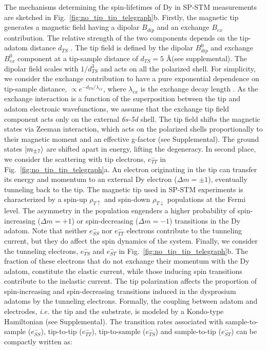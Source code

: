 \documentclass[
reprint,amsmath,amssymb,aps]{revtex4-2}
\begin{document}
The mechanisms determining the spin-lifetimes of Dy in SP-STM measurements are sketched in Fig.~\ref{fig:no_tip_tip_telegraph}b.
Firstly, the magnetic tip generates a magnetic field having a dipolar $B_{dip}$ and an exchange $B_{ex}$ contribution. The relative strength of the two components depends on the tip-adatom distance $d_{TS}$ \cite{willke}. 
The tip field is defined by the dipolar $B^0_{dip}$ and exchange $B^0_{ex}$ component at a tip-sample distance of $d_{TS}=5$ \AA (see supplemental). The dipolar field scales with $1/d_{TS}^3$ and acts on all the polarized shell. For simplicity, we consider the exchange contribution to have a pure exponential dependence on tip-sample distance, $\propto e^{-d_{TS}/\lambda_{ex}}$, where $\lambda_{ex}$ is the exchange decay length \cite{}.
As the exchange interaction is a function of the superposition between the tip and adatom electronic wavefunctions, we assume that the exchange tip field component acts only on the external \textit{6s-5d} shell.
The tip field shifts the magnetic states via Zeeman interaction, which acts on the polarized shells proportionally to their magnetic moment and an effective g-factor (see Supplemental). 
The ground states $\ket{m_{\pm7}}$  are shifted apart in energy, lifting the degeneracy. In second place, we consider the scattering with tip electrons, $e^{-}_{TT}$ in Fig.~\ref{fig:no_tip_tip_telegraph}a. An electron originating in the tip can transfer its energy and momentum to an external Dy electron ($\Delta m=\pm 1$), eventually tunneling back to the tip. The magnetic tip used in SP-STM experiments is characterized by a spin-up $\rho_{T\uparrow}$ and spin-down $\rho_{T\downarrow}$ populations at the Fermi level. The asymmetry in the population engenders a higher probability of spin-increasing ($\Delta m=+1$) or spin-decreasing ($\Delta m=-1$) transitions in the Dy adatom. Note that neither $e^{-}_{SS}$ nor $e^{-}_{TT}$ electrons contribute to the tunneling current, but they do affect the spin dynamics of the system. Finally, we consider the tunneling electrons, $e^{-}_{TS}$ and $e^{-}_{ST}$ in Fig.~\ref{fig:no_tip_tip_telegraph}b. The fraction of these electrons that do not exchange their momentum with the Dy adatom, constitute the elastic current, while those inducing spin transitions contribute to the inelastic current. The tip polarization affects the proportion of spin-increasing and spin-decreasing transitions induced in the dysprosium adatoms by the tunneling electrons. Formally, the coupling between adatom and electrodes, \textit{i.e.} the tip and the substrate, is modeled by a Kondo-type Hamiltonian \cite{delgado2010} (see Supplemental). The transition rates associated with sample-to-sample ($e^{-}_{SS}$), tip-to-tip ($e^{-}_{TT}$), tip-to-sample ($e^{-}_{TS}$) and sample-to-tip ($e^{-}_{ST}$) can be compactly written as:
\end{document}
